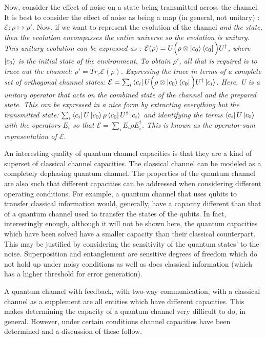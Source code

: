 \documentclass[letterpaper,twoside,10pt]{article}
\begin{document}
Now, consider the effect of noise on a state being transmitted across the channel. It is best to consider the effect of noise as being a map (in general, not unitary) : $\mathcal{E} : \rho \mapsto \rho'$. Now, if we want to represent the evolution of the channel \em and \em the state, then the evolution encompasses the entire universe so the evolution is unitary. This unitary evolution can be expressed as : $\mathcal{E}(\rho)=U\Big(\rho\otimes\ket{c_0}\bra{c_0}\Big)U^\dagger$, where $\ket{c_0}$ is the initial state of the environment. To obtain $\rho'$, all that is required is to trace out the channel: $\rho' = Tr_{c}{\mathcal{E}(\rho)}$. Expressing the trace in terms of a complete set of orthogonal channel states: $\mathcal{E}=\sum_i\bra{c_i}U\Big(\rho\otimes\ket{c_0}\bra{c_0}\Big)U^\dagger\ket{c_i}$. Here, U is a unitary operator that acts on the combined state of the channel and the prepared state. This can be expressed in a nice form by extracting everything but the transmitted state: $\sum_i\bra{c_i}U\ket{c_0}\rho\bra{c_0}U^\dagger\ket{c_i}$ and identifying the terms $\bra{c_i}U\ket{c_0}$ with the operators $E_i$ so that $\mathcal{E}=\sum_i E_i \rho E_i^\dagger$. This is known as the operator-sum representation of $\mathcal{E}$.

An interesting quality of quantum channel capacities is that they are a kind of superset of classical channel capacities. The classical channel can be modeled as a completely dephasing quantum channel. The properties of the quantum channel are also such that different capacities can be addressed when considering different operating conditions. For example, a  quantum channel that uses qubits to transfer classical information would, generally, have a capacity different than that of a quantum channel used to transfer the states of the qubits. In fact, interestingly enough, although it will not be shown here, the quantum capacities which have been solved have a smaller capacity than their classical counterpart. This may be justified by considering the sensitivity of the quantum states' to the noise. Superposition and entanglement are sensitive degrees of freedom which do not hold up under noisy conditions as well as does classical information (which has a higher threshold for error generation).

A quantum channel with feedback, with two-way communication, with a classical channel as a supplement are all entities which have different capacities. This makes determining the capacity of a quantum channel very difficult to do, in general. However, under certain conditions channel capacities have been determined and a discussion of these follow.
\end{document}
